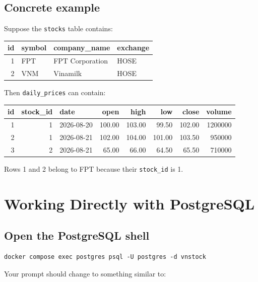 \documentclass[11pt,a4paper]{article}
\begin{document}
\subsection{Concrete example}

Suppose the \texttt{stocks} table contains:

\begin{center}
\begin{tabular}{rlll}
\toprule
\textbf{id} & \textbf{symbol} & \textbf{company\_name} & \textbf{exchange} \\
\midrule
1 & FPT & FPT Corporation & HOSE \\
2 & VNM & Vinamilk & HOSE \\
\bottomrule
\end{tabular}
\end{center}

Then \texttt{daily\_prices} can contain:

\begin{center}
\small
\begin{tabular}{rrlrrrrr}
\toprule
\textbf{id} & \textbf{stock\_id} & \textbf{date} &
\textbf{open} & \textbf{high} & \textbf{low} & \textbf{close} &
\textbf{volume} \\
\midrule
1 & 1 & 2026-08-20 & 100.00 & 103.00 & 99.50 & 102.00 & 1200000 \\
2 & 1 & 2026-08-21 & 102.00 & 104.00 & 101.00 & 103.50 & 950000 \\
3 & 2 & 2026-08-21 & 65.00 & 66.00 & 64.50 & 65.50 & 710000 \\
\bottomrule
\end{tabular}
\end{center}

Rows 1 and 2 belong to FPT because their \texttt{stock\_id} is 1.

\section{Working Directly with PostgreSQL}

\subsection{Open the PostgreSQL shell}

\begin{lstlisting}[style=terminal]
docker compose exec postgres psql -U postgres -d vnstock
\end{lstlisting}

Your prompt should change to something similar to:
\end{document}
